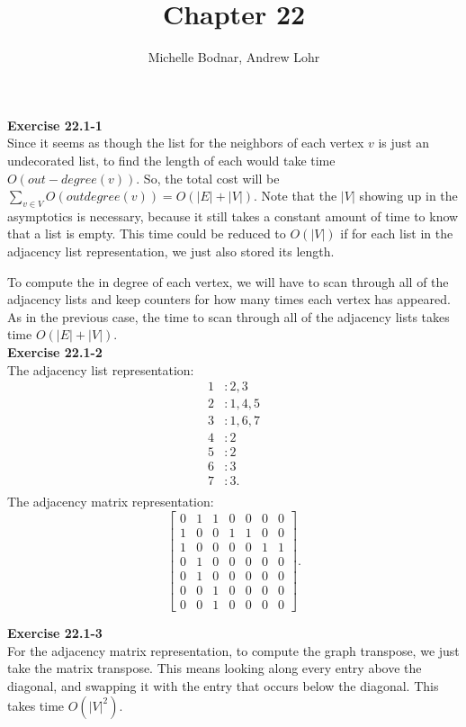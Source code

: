 \documentclass{article}
\title{Chapter 22}
\author{Michelle Bodnar, Andrew Lohr}
\begin{document}
\maketitle


\noindent\textbf{Exercise 22.1-1}\\

Since it seems as though the list for the neighbors of each vertex $v$ is just an undecorated list, to find the length of each would take time $O(out-degree(v))$. So, the total cost will be $\sum_{v\in V} O(outdegree(v)) = O(|E| +|V|)$. Note that the $|V|$ showing up in the asymptotics is necessary, because it still takes a constant amount of time to know that a list is empty. This time could be reduced to $O(|V|)$ if for each list in the adjacency list representation, we just also stored its length.

To compute the in degree of each vertex, we will have to scan through all of the adjacency lists and keep counters for how many times each vertex has appeared. As in the previous case, the time to scan through all of the adjacency lists takes time $O(|E|+|V|)$.\\

\noindent\textbf{Exercise 22.1-2}\\

The adjacency list representation:
\begin{align*}
1&: 2,3\\
2&: 1,4,5 \\
3&: 1,6,7\\
4&: 2\\
5&: 2\\
6&: 3\\
7&: 3.\\
\end{align*}
The adjacency matrix representation:
\[ \left[\begin{array}{ccccccc} 0&1&1&0&0&0&0 \\ 1&0&0&1&1&0&0 \\ 1&0&0&0&0&1&1 \\ 0&1&0&0&0&0&0 \\ 0&1&0&0&0&0&0 \\ 0&0&1&0&0&0&0 \\ 0&0&1&0&0&0&0  \end{array}\right]. \]

\noindent\textbf{Exercise 22.1-3}\\

For the adjacency matrix representation, to compute the graph transpose, we just take the matrix transpose. This means looking along every entry above the diagonal, and swapping it with the entry that occurs below the diagonal. This takes time $O(|V|^2)$.
\end{document}
